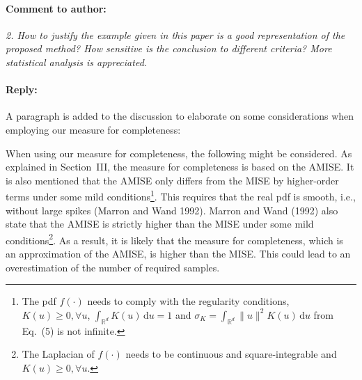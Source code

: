 \documentclass[10pt,final,a4paper,oneside,onecolumn]{article}
\newcommand*{\ud}{\mathrm{\,d}}
\newcommand{\toauthor}{\paragraph*{Comment to author:} \itshape}
\newcommand{\fromauthor}{\paragraph*{Reply:} \normalfont}
\newcommand{\cstart}{\cbstart\color{red}}
\newcommand{\cend}{\cbend\color{black}}
\begin{document}
\toauthor 2. How to justify the example given in this paper is a good representation of the proposed method? How sensitive is the conclusion to different criteria? More statistical analysis is appreciated.

\fromauthor A paragraph is added to the discussion to elaborate on some considerations when employing our measure for completeness:

\cstart
When using our measure for completeness, the following might be considered. As explained in Section~III, the measure for completeness is based on the AMISE. It is also mentioned that the AMISE only differs from the MISE by higher-order terms under some mild conditions\footnote{The pdf $f(\cdot)$ needs to comply with the regularity conditions, $K(u) \geq 0, \forall u$, $\int_{\mathbb{R}^d} K(u) \ud u = 1$ and $\sigma_K=\int_{\mathbb{R}^d} \|u\|^2 K(u) \ud u$ from Eq.~(5) is not infinite.}. This requires that the real pdf is smooth, i.e., without large spikes (Marron and Wand 1992). Marron and Wand (1992) also state that the AMISE is strictly higher than the MISE under some mild conditions\footnote{The Laplacian of $f(\cdot)$ needs to be continuous and square-integrable and $K(u) \geq 0, \forall u$.}. As a result, it is likely that the measure for completeness, which is an approximation of the AMISE, is higher than the MISE. This could lead to an overestimation of the number of required samples.
\cend
\end{document}
